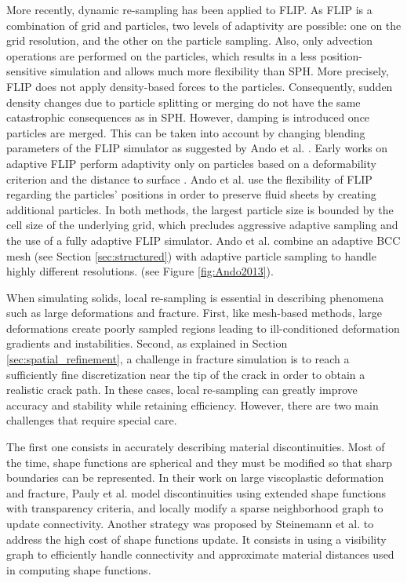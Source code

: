 More recently, dynamic re-sampling has been applied to FLIP. As FLIP is a combination of grid and particles, two levels of adaptivity are possible: one on the grid resolution, and the other on the particle sampling. Also, only advection operations are performed on the particles, which results in a less position-sensitive simulation and allows much more flexibility than SPH. More precisely, FLIP does not apply density-based forces to the particles. Consequently, sudden density changes due to particle splitting or merging do not have the same catastrophic consequences as in SPH. However, damping is introduced once particles are merged. This can be taken into account by changing blending parameters of the FLIP simulator as suggested by Ando et al. \cite{Ando2012}.
Early works on adaptive FLIP perform adaptivity only on particles based on a deformability criterion and the distance to surface \cite{Hong2008FLIP, Ando2012}. Ando et al. use the flexibility of FLIP regarding the particles' positions in order to preserve fluid sheets by creating additional particles.
In both methods, the largest particle size is bounded by the cell size of the underlying grid, which precludes aggressive adaptive sampling and the use of a fully adaptive FLIP simulator. Ando et al. \cite{Ando2013} combine an adaptive BCC mesh (see Section \ref{sec:structured}) with adaptive particle sampling to handle highly different resolutions. (see Figure \ref{fig:Ando2013}).

When simulating solids, local re-sampling is essential in describing phenomena such as large deformations and fracture. First, like mesh-based methods, large deformations create poorly sampled regions leading to ill-conditioned deformation gradients and instabilities. Second, as explained in Section \ref{sec:spatial_refinement}, a challenge in fracture simulation is to reach a sufficiently fine discretization near the tip of the crack in order to obtain a realistic crack path. In these cases, local re-sampling can greatly improve accuracy and stability while retaining efficiency. However, there are two main challenges that require special care.

The first one consists in accurately describing material discontinuities. Most of the time, shape functions are spherical and they must be modified so that sharp boundaries can be represented. In their work on large viscoplastic deformation and fracture, Pauly et al. \cite{Pauly2005} model discontinuities using extended shape functions with transparency criteria, and locally modify a sparse neighborhood graph to update connectivity. Another strategy was proposed by Steinemann et al. \cite{Steinemann2009} to address the high cost of shape functions update. It consists in using a visibility graph to efficiently handle connectivity and approximate material distances used in computing shape functions.


